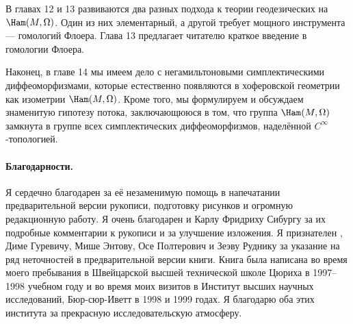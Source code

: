 В главах 12 и 13 развиваются два разных подхода к теории геодезических на $\Ham(M,\Omega)$.
Один из них элементарный, а другой требует мощного инструмента --- гомологий Флоера.
Глава 13 предлагает читателю краткое введение в гомологии Флоера.

Наконец, в главе 14 мы имеем дело с негамильтоновыми симплектическими диффеоморфизмами, которые естественно появляются в хоферовской геометрии как изометрии $\Ham(M,\Omega)$.
Кроме того, мы формулируем и обсуждаем знаменитую гипотезу потока,
заключающююся в том, что группа $\Ham(M,\Omega)$ замкнута в группе всех симплектических диффеоморфизмов, наделённой $C^\infty$-топологией. 

\paragraph*{Благодарности.}
Я сердечно благодарен  %
за её незаменимую помощь в напечатании предварительной версии рукописи,
подготовку рисунков и огромную редакционную работу.
Я очень благодарен  и Карлу Фридриху Сибургу за их подробные комментарии к рукописи и за улучшение изложения.
Я признателен , Диме Гуревичу, Мише Энтову, Осе Полтерович и Зеэву Руднику за указание на ряд неточностей в предварительной версии книги.
Книга была написана во время моего пребывания в Швейцарской высшей технической школе Цюриха в 1997--1998 учебном году и во время моих визитов в Институт высших научных исследований, Бюр-сюр-Иветт в 1998 и 1999 годах.
Я благодарю оба этих института за прекрасную исследовательскую атмосферу. 
